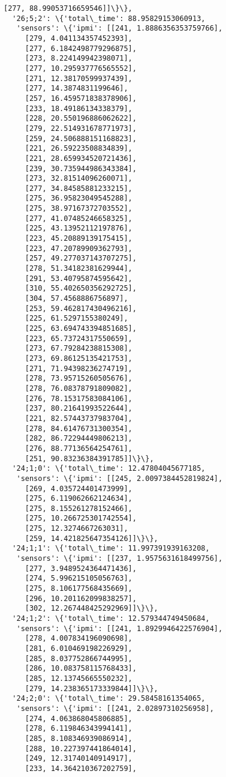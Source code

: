 \documentclass[11pt]{article}
\begin{document}
\begin{tcolorbox}[breakable, size=fbox, boxrule=.5pt, pad at break*=1mm, opacityfill=0]
\begin{Verbatim}[commandchars=\\\{\}]
     [277, 88.99053716659546]]\}\},
  '26;5;2': \{'total\_time': 88.95829153060913,
   'sensors': \{'ipmi': [[241, 1.8886356353759766],
     [279, 4.041134357452393],
     [277, 6.1842498779296875],
     [273, 8.224149942398071],
     [277, 10.295937776565552],
     [271, 12.38170599937439],
     [277, 14.3874831199646],
     [257, 16.459571838378906],
     [233, 18.49186134338379],
     [228, 20.550196886062622],
     [279, 22.514931678771973],
     [259, 24.506888151168823],
     [221, 26.59223508834839],
     [221, 28.659934520721436],
     [239, 30.735944986343384],
     [273, 32.81514096260071],
     [277, 34.84585881233215],
     [275, 36.95823049545288],
     [275, 38.97167372703552],
     [277, 41.07485246658325],
     [225, 43.13952112197876],
     [223, 45.20889139175415],
     [223, 47.20789909362793],
     [257, 49.277037143707275],
     [278, 51.34182381629944],
     [291, 53.40795874595642],
     [310, 55.402650356292725],
     [304, 57.4568886756897],
     [253, 59.462817430496216],
     [225, 61.5297155380249],
     [225, 63.694743394851685],
     [223, 65.73724317550659],
     [273, 67.79284238815308],
     [273, 69.86125135421753],
     [271, 71.94398236274719],
     [278, 73.95715260505676],
     [278, 76.08378791809082],
     [276, 78.15317583084106],
     [237, 80.21641993522644],
     [221, 82.57443737983704],
     [278, 84.61476731300354],
     [282, 86.72294449806213],
     [276, 88.77136564254761],
     [251, 90.83236384391785]]\}\},
  '24;1;0': \{'total\_time': 12.47804045677185,
   'sensors': \{'ipmi': [[245, 2.0097384452819824],
     [269, 4.035724401473999],
     [275, 6.119062662124634],
     [275, 8.155261278152466],
     [275, 10.266725301742554],
     [275, 12.3274667263031],
     [259, 14.421825647354126]]\}\},
  '24;1;1': \{'total\_time': 11.997391939163208,
   'sensors': \{'ipmi': [[237, 1.9575631618499756],
     [277, 3.9489524364471436],
     [274, 5.996215105056763],
     [275, 8.106177568435669],
     [296, 10.201162099838257],
     [302, 12.267448425292969]]\}\},
  '24;1;2': \{'total\_time': 12.579344749450684,
   'sensors': \{'ipmi': [[241, 1.8929946422576904],
     [278, 4.007834196090698],
     [281, 6.010469198226929],
     [285, 8.037752866744995],
     [286, 10.083758115768433],
     [285, 12.13745665550232],
     [279, 14.238365173339844]]\}\},
  '24;2;0': \{'total\_time': 29.58458161354065,
   'sensors': \{'ipmi': [[241, 2.02897310256958],
     [274, 4.063868045806885],
     [278, 6.119846343994141],
     [285, 8.108346939086914],
     [288, 10.227397441864014],
     [249, 12.31740140914917],
     [233, 14.364210367202759],

\end{Verbatim}
\end{tcolorbox}
\end{document}
